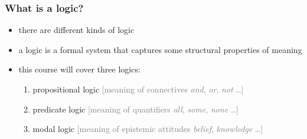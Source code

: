 \documentclass[fleqn,10pt,serif,xcolor=svgnames,xcolor=table,aspectratio=169]{beamer}
\newcommand{\mycom}[1]{\hfill {\mygray{[#1]}}}
\newcommand{\mygray}[1]{\textcolor{gray}{#1}}
\begin{document}
\begin{frame}
  \frametitle{What is \textbf{a} logic?}

  \begin{itemize}
    \item there are different kinds of logic
    \item a logic is a formal system that captures some structural properties of meaning
    \item this course will cover three logics:
    \begin{enumerate}
      \item propositional logic \mycom{meaning of connectives \textit{and}, \textit{or}, \textit{not} \dots}
      \item predicate logic \mycom{meaning of quantifiers \textit{all}, \textit{some}, \textit{none} \dots}
      \item modal logic \mycom{meaning of epistemic attitudes \textit{belief}, \textit{knowledge} \dots}
    \end{enumerate}
  \end{itemize}

\end{frame}
\end{document}
